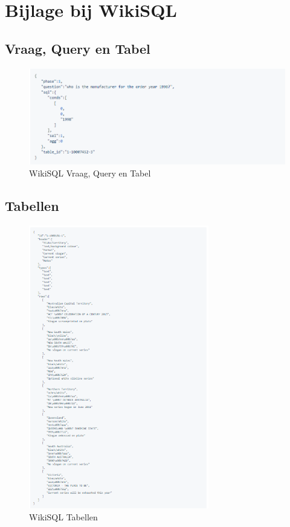 \chapter{Bijlage bij WikiSQL}
\label{ch:bijlage1}
\section{Vraag, Query en Tabel} %
\begin{figure}[htb]
	\centering
	\includegraphics[width=1\textwidth]{img/vraag}
	\caption[WikiSQL Vraag, Query en Tabel]{WikiSQL Vraag, Query en Tabel}
\end{figure}
\break
\section{Tabellen} %
\begin{figure}[htb]
	\centering
	\includegraphics[width=0.7\textwidth]{img/tabel}
	\caption[WikiSQL Tabellen]{WikiSQL Tabellen}
\end{figure}